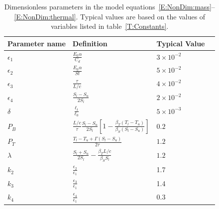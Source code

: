\documentclass[openacc]{rsproca_new}%
\newcommand{\epsone}{\epsilon_{1}} %
\newcommand{\epstwo}{\epsilon_{2}} %
\newcommand{\epsthree}{\epsilon_{3}} %
\newcommand{\epsfour}{\epsilon_{4}}
\newcommand{\Pb}{\textit{P}_B}  %
\newcommand{\lt}{\delta} %
\newcommand{\Pt}{\textit{P}_T}
\begin{document}
\begin{table}[!h]
\caption{Dimensionless parameters in the model equations~\eqref{E:NonDim:mass}--\eqref{E:NonDim:thermal}. Typical values are based on the values of variables listed in table~\ref{T:Constants}.}\label{T:Dimensionless_Parameters}
\begin{center}
\begin{tabular}{llll}

Parameter name  & Definition   & Typical Value \\
\hline 
\vspace{2pt}
\vspace{2pt}$\epsone$ & $  \frac{E_0 \alpha}{C_d} $  &$ 3 \times 10^{-2}$ \\
\vspace{2pt}$\epstwo$ & $  \frac{E_0 \alpha}{St} $ & $ 5 \times 10^{-2}$ \\
\vspace{2pt}$\epsthree$ & $  \frac{\tau}{L/c} $ & $ 4 \times 10^{-2}$ \\
\vspace{2pt}$\epsfour$ & $  \frac{S_l - S_u}{2 S_l} $  &$ 2 \times 10^{-2}$ \\
\vspace{2pt}$\lt$ & $  \frac{\ell_t}{\ell_0} $ & $  5 \times 10^{-3}$ \\
\vspace{2pt}$\Pb$ & $  \frac{L/c}{ \tau}\frac{S_l - S_u}{2S_l}\left[1 - \frac{\beta_T (T_l - T_u)}{\beta_S (S_l - S_u)}\right]$   & $  0.2$ \\
\vspace{2pt}$\Pt$ & $ \frac{T_l - T_u + \Gamma( S_l - S_u)}{2 \tau}$ & $  1.2$ \\
\vspace{2pt}$\lambda$ & $ \frac{S_l + S_u}{2S_l} -  \frac{\beta_T L/c}{ \beta_S S_l}$ &  $  1.2$ \\
\hline
\vspace{2pt}$k_2$ & $\frac{\epstwo}{\epsone}$ & 1.7\\
\vspace{2pt}$k_3$ & $\frac{\epsthree} {\epsone}$ & 1.4\\
\vspace{2pt}$k_4$ & $\frac{\epsfour}{\epsone}$ & 0.3\\
\end{tabular}
\end{center}
\vspace*{-4pt}
\end{table}
 
\end{document}
